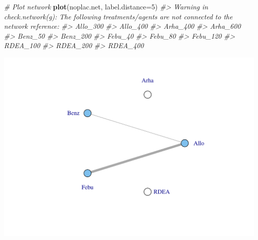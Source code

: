 \documentclass[]{article}
\newenvironment{Shaded}{\begin{snugshade}}{\end{snugshade}}
\newcommand{\CommentTok}[1]{\textcolor[rgb]{0.56,0.35,0.01}{\textit{#1}}}
\newcommand{\DataTypeTok}[1]{\textcolor[rgb]{0.13,0.29,0.53}{#1}}
\newcommand{\DecValTok}[1]{\textcolor[rgb]{0.00,0.00,0.81}{#1}}
\newcommand{\KeywordTok}[1]{\textcolor[rgb]{0.13,0.29,0.53}{\textbf{#1}}}
\newcommand{\NormalTok}[1]{#1}
\newcommand{\OperatorTok}[1]{\textcolor[rgb]{0.81,0.36,0.00}{\textbf{#1}}}
\newcommand{\StringTok}[1]{\textcolor[rgb]{0.31,0.60,0.02}{#1}}
\begin{document}
\begin{Shaded}
\end{Shaded}

\begin{Shaded}
\begin{Highlighting}[]
\CommentTok{# Plot network}
\KeywordTok{plot}\NormalTok{(noplac.net, }\DataTypeTok{label.distance=}\DecValTok{5}\NormalTok{)}
\CommentTok{#> Warning in check.network(g): The following treatments/agents are not connected to the network reference:}
\CommentTok{#> Allo_300}
\CommentTok{#> Allo_400}
\CommentTok{#> Arha_400}
\CommentTok{#> Arha_600}
\CommentTok{#> Benz_50}
\CommentTok{#> Benz_200}
\CommentTok{#> Febu_40}
\CommentTok{#> Febu_80}
\CommentTok{#> Febu_120}
\CommentTok{#> RDEA_100}
\CommentTok{#> RDEA_200}
\CommentTok{#> RDEA_400}
\end{Highlighting}
\end{Shaded}

\includegraphics{mbnmadose_files/figure-latex/unnamed-chunk-29-1.pdf}
\end{document}
